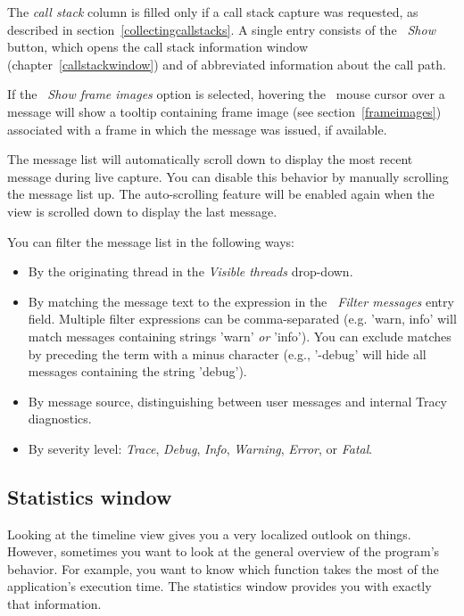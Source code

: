 \documentclass[hidelinks,titlepage,a4paper,twoside]{article}
\begin{document}
The \emph{call stack} column is filled only if a call stack capture was requested, as described in section~\ref{collectingcallstacks}. A single entry consists of the \emph{\faAlignJustify{}~Show} button, which opens the call stack information window (chapter~\ref{callstackwindow}) and of abbreviated information about the call path.

If the \emph{\faImage{}~Show frame images} option is selected, hovering the \faArrowPointer{}~mouse cursor over a message will show a tooltip containing frame image (see section~\ref{frameimages}) associated with a frame in which the message was issued, if available.

The message list will automatically scroll down to display the most recent message during live capture. You can disable this behavior by manually scrolling the message list up. The auto-scrolling feature will be enabled again when the view is scrolled down to display the last message.

You can filter the message list in the following ways:

\begin{itemize}
\item By the originating thread in the \emph{\faShuffle{} Visible threads} drop-down.
\item By matching the message text to the expression in the \emph{\faFilter{}~Filter messages} entry field. Multiple filter expressions can be comma-separated (e.g. 'warn, info' will match messages containing strings 'warn' \emph{or} 'info'). You can exclude matches by preceding the term with a minus character (e.g., '-debug' will hide all messages containing the string 'debug').
\item By message source, distinguishing between user messages and internal Tracy diagnostics.
\item By severity level: \emph{Trace}, \emph{Debug}, \emph{Info}, \emph{Warning}, \emph{Error}, or \emph{Fatal}.
\end{itemize}

\subsection{Statistics window}
\label{statistics}

Looking at the timeline view gives you a very localized outlook on things. However, sometimes you want to look at the general overview of the program's behavior. For example, you want to know which function takes the most of the application's execution time. The statistics window provides you with exactly that information.
\end{document}
